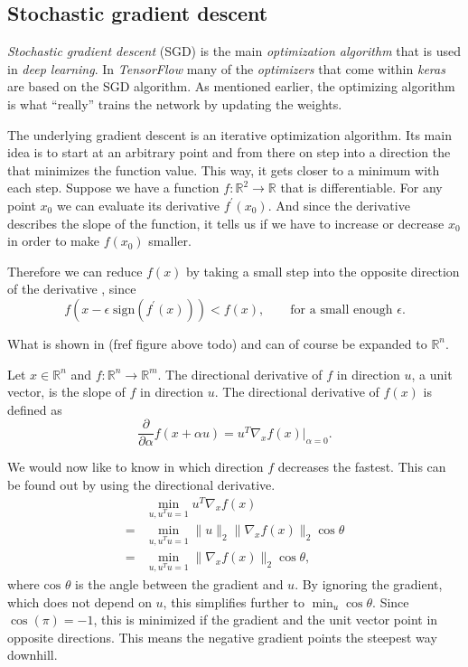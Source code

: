 \subsection{Stochastic gradient descent}
\label{sec:stochastic-gradient-descent}
\emph{Stochastic gradient descent} (SGD) is the main \emph{optimization algorithm} that is used in \emph{deep learning}.
In \emph{TensorFlow} many of the \emph{optimizers} that come within \emph{keras} are based on the SGD algorithm.
As mentioned earlier, the optimizing algorithm is what \enquote{really} trains the network by updating the weights.

The underlying gradient descent is an iterative optimization algorithm.
Its main idea is to start at an arbitrary point and from there on step into a direction the that minimizes the function value.
This way, it gets closer to a minimum with each step.
Suppose we have a function \(f : \mathbb{R}^2 \rightarrow \mathbb{R}\) that is differentiable.
For any point \(x_0\) we can evaluate its derivative \(f^{\prime}(x_0)\).
And since the derivative describes the slope of the function, it tells us if we have to increase or decrease \(x_0\) in order to make \(f(x_0)\) smaller.

Therefore we can reduce \(f(x)\) by taking a small step into the opposite direction of the derivative \cite{cauchy}, since
\begin{equation}
    \label{eq:cauchy}
    f(x - \epsilon \; \text{sign}(f^{\prime}(x))) < f(x), \qquad \text{for a small enough } \epsilon.
\end{equation}


What is shown in (fref figure above todo) and  can of course be expanded to \(\mathbb{R}^n\).

Let \(x \in \mathbb{R}^n\) and \(f : \mathbb{R}^n \rightarrow \mathbb{R}^m\).
The directional derivative of \(f\) in direction \(u\), a unit vector, is the slope of \(f\) in direction \(u\).
The directional derivative of \(f(x)\) is defined as 
\begin{equation}
    \frac{\partial}{\partial \alpha} f(x + \alpha u) = u^{T} \nabla_x f(x) \big\vert_{\alpha = 0}.
\end{equation}

We would now like to know in which direction \(f\) decreases the fastest.
This can be found out by using the directional derivative.
\begin{align}
      &\min_{u, u^{T}u = 1} u^{T} \nabla_x f(x) \\
    = &\min_{u, u^{T}u = 1} \lVert u \rVert_2 \lVert \nabla_x f(x) \rVert_2 \cos \theta \\
    = &\min_{u, u^{T}u = 1} \lVert \nabla_x f(x) \rVert_2 \cos \theta,
\end{align}
where \(\text{cos } \theta\) is the angle between the gradient and \(u\).
By ignoring the gradient, which does not depend on \(u\), this simplifies further to \(\min_{u} \cos \theta\).
Since \(\cos(\pi) = -1\), this is minimized if the gradient and the unit vector point in opposite directions.
This means the negative gradient points the steepest way downhill.

